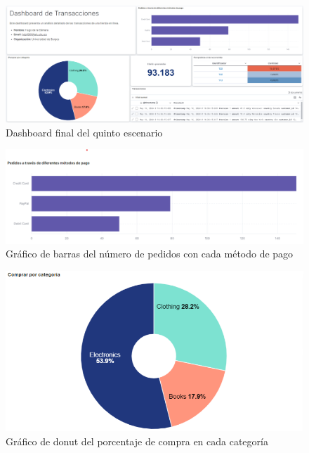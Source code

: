 \begin{figure}
    \centering
    \includegraphics[width=1\linewidth]{img/escenario2.png}
    \caption{Dashboard final del quinto escenario}
    \label{fig:escenario2}
\end{figure}

\begin{figure}
    \centering
    \includegraphics[width=1\linewidth]{img/barras2.png}
    \caption{Gráfico de barras del número de pedidos con cada método de pago}
    \label{fig:barras2}
\end{figure}

\begin{figure}
    \centering
    \includegraphics[width=1\linewidth]{img/donut2.png}
    \caption{Gráfico de donut del porcentaje de compra en cada categoría}
    \label{fig:donut2}
\end{figure}


